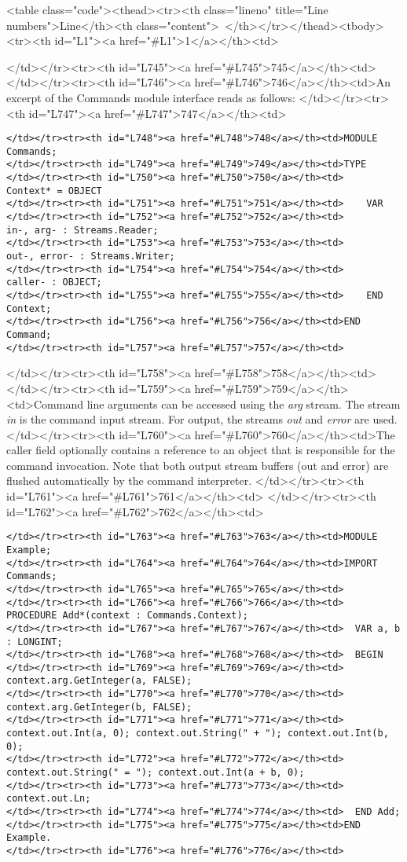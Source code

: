 <table class="code"><thead><tr><th class="lineno" title="Line numbers">Line</th><th class="content"> </th></tr></thead><tbody><tr><th id="L1"><a href="#L1">1</a></th><td>\documentclass[a4paper,11pt]{article}
\begin{document}
</td></tr><tr><th id="L745"><a href="#L745">745</a></th><td>
</td></tr><tr><th id="L746"><a href="#L746">746</a></th><td>An excerpt of the Commands module interface reads as follows:
</td></tr><tr><th id="L747"><a href="#L747">747</a></th><td>\begin{lstlisting}[language=Oberon,frame=none,caption={Command Context}]
</td></tr><tr><th id="L748"><a href="#L748">748</a></th><td>MODULE Commands;
</td></tr><tr><th id="L749"><a href="#L749">749</a></th><td>TYPE
</td></tr><tr><th id="L750"><a href="#L750">750</a></th><td>    Context* = OBJECT
</td></tr><tr><th id="L751"><a href="#L751">751</a></th><td>    VAR
</td></tr><tr><th id="L752"><a href="#L752">752</a></th><td>        in-, arg- : Streams.Reader;
</td></tr><tr><th id="L753"><a href="#L753">753</a></th><td>        out-, error- : Streams.Writer;
</td></tr><tr><th id="L754"><a href="#L754">754</a></th><td>        caller- : OBJECT;
</td></tr><tr><th id="L755"><a href="#L755">755</a></th><td>    END Context;
</td></tr><tr><th id="L756"><a href="#L756">756</a></th><td>END Command;
</td></tr><tr><th id="L757"><a href="#L757">757</a></th><td>\end{lstlisting}
</td></tr><tr><th id="L758"><a href="#L758">758</a></th><td>
</td></tr><tr><th id="L759"><a href="#L759">759</a></th><td>Command line arguments can be accessed using the \emph{arg} stream. The stream \emph{in} is the command input stream. For output, the streams \emph{out} and \emph{error} are used.
</td></tr><tr><th id="L760"><a href="#L760">760</a></th><td>The caller field optionally contains a reference to an object that is responsible for the command invocation. Note that both output stream buffers (out and error) are flushed automatically by the command interpreter.
</td></tr><tr><th id="L761"><a href="#L761">761</a></th><td>
</td></tr><tr><th id="L762"><a href="#L762">762</a></th><td>\begin{lstlisting}[language=Oberon,frame=none,caption={Command Example}]
</td></tr><tr><th id="L763"><a href="#L763">763</a></th><td>MODULE Example;
</td></tr><tr><th id="L764"><a href="#L764">764</a></th><td>IMPORT Commands;
</td></tr><tr><th id="L765"><a href="#L765">765</a></th><td>
</td></tr><tr><th id="L766"><a href="#L766">766</a></th><td>  PROCEDURE Add*(context : Commands.Context);
</td></tr><tr><th id="L767"><a href="#L767">767</a></th><td>  VAR a, b : LONGINT;
</td></tr><tr><th id="L768"><a href="#L768">768</a></th><td>  BEGIN
</td></tr><tr><th id="L769"><a href="#L769">769</a></th><td>    context.arg.GetInteger(a, FALSE);
</td></tr><tr><th id="L770"><a href="#L770">770</a></th><td>    context.arg.GetInteger(b, FALSE);
</td></tr><tr><th id="L771"><a href="#L771">771</a></th><td>    context.out.Int(a, 0); context.out.String(" + "); context.out.Int(b, 0);
</td></tr><tr><th id="L772"><a href="#L772">772</a></th><td>    context.out.String(" = "); context.out.Int(a + b, 0);
</td></tr><tr><th id="L773"><a href="#L773">773</a></th><td>    context.out.Ln;
</td></tr><tr><th id="L774"><a href="#L774">774</a></th><td>  END Add;
</td></tr><tr><th id="L775"><a href="#L775">775</a></th><td>END Example.
</td></tr><tr><th id="L776"><a href="#L776">776</a></th><td>\end{lstlisting}
\end{document}
